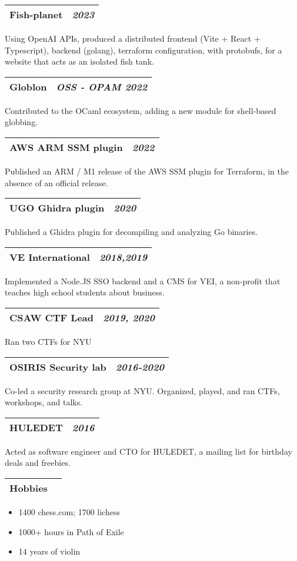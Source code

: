 \documentclass[letterpaper,10pt]{article}
\makeatletter
\newcommand{\sectiontitle}[2]{%
  \begin{tabularx}{\linewidth}{@{} X c @{}}
    {\sffamily\textbf{#1}} & {\rmfamily\textit{#2}} \\ \hline
  \end{tabularx}%
  \vspace{3pt}%
}
\makeatother
\begin{document}
\begin{minipage}[t]{\secondcolwidth}
  \sectiontitle{Fish-planet}{2023}
  Using OpenAI APIs, produced a distributed frontend (Vite + React + Typescript), backend (golang), terraform configuration, with protobufs, for a website that acts as an isolated fish tank.

  \vspace{6pt}
  \sectiontitle{Globlon}{OSS - OPAM 2022}
  Contributed to the OCaml ecosystem, adding a new module for shell-based globbing.


  \sectiontitle{AWS ARM SSM plugin}{2022}
  Published an ARM / M1 release of the AWS SSM plugin for Terraform, in the absence of an official release.

  \vspace{6pt}
  \sectiontitle{UGO Ghidra plugin}{2020}
  Published a Ghidra plugin for decompiling and analyzing Go binaries.

  \vspace{6pt}
  \sectiontitle{VE International}{2018,2019}
  Implemented a Node.JS SSO backend and a CMS for VEI, a non-profit that teaches high school students about business.

  \vspace{6pt}
  \sectiontitle{CSAW CTF Lead}{2019, 2020}
  Ran two CTFs for NYU

  \vspace{6pt}
  \sectiontitle{OSIRIS Security lab}{2016-2020}
  Co-led a security research group at NYU. Organized, played, and ran CTFs, workshops, and talks.

  \vspace{6pt}
  \sectiontitle{HULEDET}{2016}
  Acted as software engineer and CTO for HULEDET, a mailing list for birthday deals and freebies.

  \vspace{1cm plus 1fill}
  \sectiontitle{Hobbies}{}
  \begin{itemize}[leftmargin=*,noitemsep,topsep=0pt]
    \item 1400 chess.com; 1700 lichess
    \item 1000+ hours in Path of Exile
    \item 14 years of violin
  \end{itemize}
\end{minipage}

\vfill

\setlength{\arrayrulewidth}{0.1pt}
\end{document}
